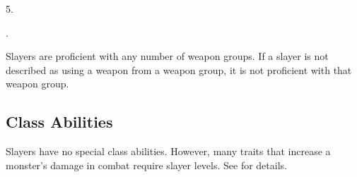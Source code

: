          5.

         .

        Slayers are proficient with any number of weapon groups.
        If a slayer is not described as using a weapon from a weapon group, it is not proficient with that weapon group.

    \subsection{Class Abilities}
        Slayers have no special class abilities.
        However, many traits that increase a monster's damage in combat require slayer levels.
        See  for details.
